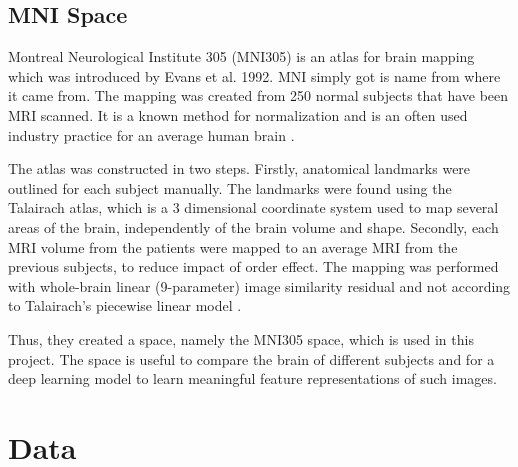 \documentclass[12pt, fleqn, titlepage]{article}
\newcommand{\1}[1]{\mathds{1}\left[#1\right]}
\begin{document}
\subsection{MNI Space}
Montreal Neurological Institute 305 (MNI305) is an atlas for brain mapping which was introduced by Evans et al. 1992. MNI simply got is name from where it came from. The mapping was created from 250 normal subjects that have been MRI scanned. It is a known method for normalization and is an often used industry practice for an average human brain  \cite{evans}. 

The atlas was constructed in two steps. Firstly, anatomical landmarks were outlined for each subject manually. The landmarks were found using the Talairach atlas, which is a 3 dimensional coordinate system used to map several areas of the brain, independently of the brain volume and shape. Secondly, each MRI volume from the patients were mapped to an average MRI from the previous subjects, to reduce impact of order effect. %
The mapping was performed with whole-brain linear (9-parameter) image similarity residual and not according to Talairach's piecewise linear model \cite{collins}. 

Thus, they created a space, namely the MNI305 space, which is used in this project. The space is useful to compare the brain of different subjects and for a deep learning model to learn meaningful feature representations of such images. 


\section{Data} 
\end{document}

